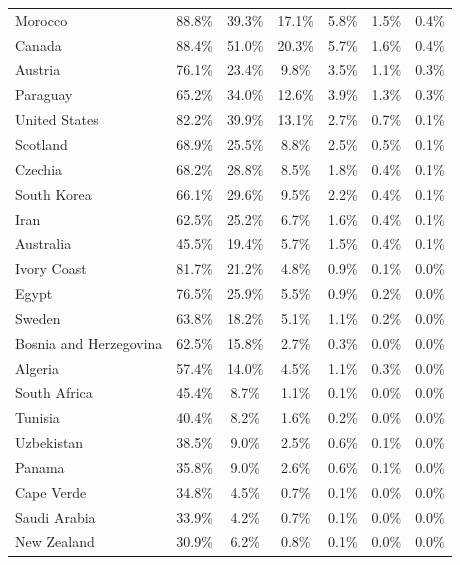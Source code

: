 \documentclass[11pt,letterpaper]{article}
\begin{document}
\begin{table}[p]
\begin{tabular}{lcccccc}
Morocco                & 88.8\% & 39.3\% & 17.1\% &  5.8\% &  1.5\% &  0.4\% \\
Canada                 & 88.4\% & 51.0\% & 20.3\% &  5.7\% &  1.6\% &  0.4\% \\
Austria                & 76.1\% & 23.4\% &  9.8\% &  3.5\% &  1.1\% &  0.3\% \\
Paraguay               & 65.2\% & 34.0\% & 12.6\% &  3.9\% &  1.3\% &  0.3\% \\
United States          & 82.2\% & 39.9\% & 13.1\% &  2.7\% &  0.7\% &  0.1\% \\
Scotland               & 68.9\% & 25.5\% &  8.8\% &  2.5\% &  0.5\% &  0.1\% \\
Czechia                & 68.2\% & 28.8\% &  8.5\% &  1.8\% &  0.4\% &  0.1\% \\
South Korea            & 66.1\% & 29.6\% &  9.5\% &  2.2\% &  0.4\% &  0.1\% \\
Iran                   & 62.5\% & 25.2\% &  6.7\% &  1.6\% &  0.4\% &  0.1\% \\
Australia              & 45.5\% & 19.4\% &  5.7\% &  1.5\% &  0.4\% &  0.1\% \\
Ivory Coast            & 81.7\% & 21.2\% &  4.8\% &  0.9\% &  0.1\% &  0.0\% \\
Egypt                  & 76.5\% & 25.9\% &  5.5\% &  0.9\% &  0.2\% &  0.0\% \\
Sweden                 & 63.8\% & 18.2\% &  5.1\% &  1.1\% &  0.2\% &  0.0\% \\
Bosnia and Herzegovina & 62.5\% & 15.8\% &  2.7\% &  0.3\% &  0.0\% &  0.0\% \\
Algeria                & 57.4\% & 14.0\% &  4.5\% &  1.1\% &  0.3\% &  0.0\% \\
South Africa           & 45.4\% &  8.7\% &  1.1\% &  0.1\% &  0.0\% &  0.0\% \\
Tunisia                & 40.4\% &  8.2\% &  1.6\% &  0.2\% &  0.0\% &  0.0\% \\
Uzbekistan             & 38.5\% &  9.0\% &  2.5\% &  0.6\% &  0.1\% &  0.0\% \\
Panama                 & 35.8\% &  9.0\% &  2.6\% &  0.6\% &  0.1\% &  0.0\% \\
Cape Verde             & 34.8\% &  4.5\% &  0.7\% &  0.1\% &  0.0\% &  0.0\% \\
Saudi Arabia           & 33.9\% &  4.2\% &  0.7\% &  0.1\% &  0.0\% &  0.0\% \\
New Zealand            & 30.9\% &  6.2\% &  0.8\% &  0.1\% &  0.0\% &  0.0\% \\

\end{tabular}
\end{table}
\end{document}
